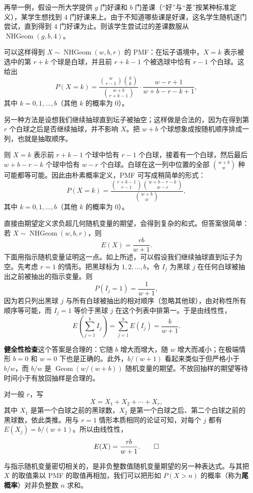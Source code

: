 \documentclass[UTF8,12pt,a4paper,fontset=fandol]{ctexart}
\begin{document}
再举一例，假设一所大学提供 $g$ 门好课和 $b$ 门差课（“好”与“差”按某种标准定义），某学生想找到 $4$ 门好课来上。由于不知道哪些课是好课，这名学生随机逐门尝试，直到得到 $4$ 门好课为止。则该学生尝试过的差课数服从 $\operatorname{NHGeom}(g,b,4)$。

可以这样得到 $X\sim\operatorname{NHGeom}(w,b,r)$ 的 PMF：在坛子语境中，$X=k$ 表示被选中的第 $r+k$ 个球是白球，并且前 $r+k-1$ 个被选球中恰有 $r-1$ 个白球。这给出
\[
  P(X=k)=
  \frac{\binom{w}{r-1}\binom{b}{k}}{\binom{w+b}{r+k-1}}
  \cdot
  \frac{w-r+1}{w+b-r-k+1},
\]
其中 $k=0,1,\ldots,b$（其他 $k$ 的概率为 $0$）。

另一种方法是设想我们继续抽球直到坛子被抽空；这样做是合法的，因为在得到第 $r$ 个白球之后是否继续抽球，并不影响 $X$。把 $w+b$ 个球想象成按随机顺序排成一列，也就是抽取顺序。

则 $X=k$ 表示前 $r+k-1$ 个球中恰有 $r-1$ 个白球，接着有一个白球，然后最后 $w+b-r-k$ 个球中恰有 $w-r$ 个白球。白球在这一列中位置的全部 $\binom{w+b}{w}$ 种可能都等可能。因此由朴素概率定义，PMF 可写成稍简单的形式：
\[
  P(X=k)=
  \frac{\binom{r+k-1}{r-1}\binom{w+b-r-k}{w-r}}{\binom{w+b}{w}},
\]
其中 $k=0,1,\ldots,b$（其他 $k$ 的概率为 $0$）。

直接由期望定义求负超几何随机变量的期望，会得到复杂的和式。但答案很简单：若 $X\sim\operatorname{NHGeom}(w,b,r)$，则
\[
  E(X)=\frac{rb}{w+1}.
\]
下面用指示随机变量证明这一点。如上所述，可以假设我们继续抽球直到坛子为空。先考虑 $r=1$ 的情形。把黑球标为 $1,2,\ldots,b$，令 $I_j$ 为黑球 $j$ 在任何白球被抽出之前被抽出的指示变量。则
\[
  P(I_j=1)=\frac{1}{w+1},
\]
因为若只列出黑球 $j$ 与所有白球被抽出的相对顺序（忽略其他球），由对称性所有顺序等可能，而 $I_j=1$ 等价于黑球 $j$ 在这个列表中排第一。于是由线性性，
\[
  E\left(\sum_{j=1}^b I_j\right)
  =\sum_{j=1}^b E(I_j)
  =\frac{b}{w+1}.
\]

\noindent\textbf{健全性检查}\quad 这个答案是合理的：它随 $b$ 增大而增大，随 $w$ 增大而减小；在极端情形 $b=0$ 和 $w=0$ 下也是正确的。此外，$b/(w+1)$ 看起来类似于但严格小于 $b/w$，而 $b/w$ 是 $\operatorname{Geom}(w/(w+b))$ 随机变量的期望。不放回抽样的期望等待时间小于有放回抽样是合理的。

对一般 $r$，写
\[
  X=X_1+X_2+\cdots+X_r,
\]
其中 $X_1$ 是第一个白球之前的黑球数，$X_2$ 是第一个白球之后、第二个白球之前的黑球数，依此类推。用与 $r=1$ 情形本质相同的论证可知，对每个 $j$ 都有 $E(X_j)=b/(w+1)$。所以由线性性，
\[
  E(X)=\frac{rb}{w+1}. \qed
\]

与指示随机变量密切相关的，是非负整数值随机变量期望的另一种表达式。与其把 $X$ 的取值乘以 PMF 的取值再相加，我们可以把形如 $P(X>n)$ 的概率（称为\textbf{尾概率}）对非负整数 $n$ 求和。
\end{document}
